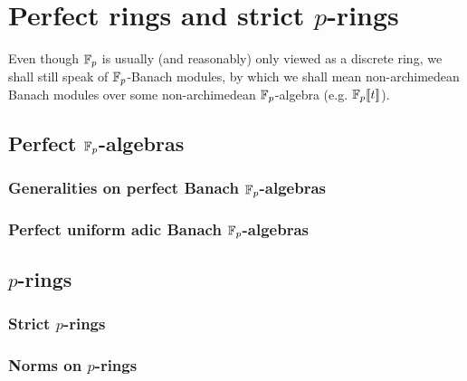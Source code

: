 \section{Perfect rings and strict \texorpdfstring{$p$}{}-rings}
    \begin{convention}
        Even though $\mathbb{F}_p$ is usually (and reasonably) only viewed as a discrete ring, we shall still speak of $\mathbb{F}_p$-Banach modules, by which we shall mean non-archimedean Banach modules over some non-archimedean $\mathbb{F}_p$-algebra (e.g. $\mathbb{F}_p[\![t]\!]$). 
    \end{convention}
    
    \subsection{Perfect \texorpdfstring{$\mathbb{F}_p$}{}-algebras}
        \subsubsection{Generalities on perfect Banach \texorpdfstring{$\mathbb{F}_p$}{}-algebras}
        
        \subsubsection{Perfect uniform adic Banach \texorpdfstring{$\mathbb{F}_p$}{}-algebras}
    
    \subsection{\texorpdfstring{$p$}{}-rings}
        \subsubsection{Strict \texorpdfstring{$p$}{}-rings}
        
        \subsubsection{Norms on \texorpdfstring{$p$}{}-rings}
